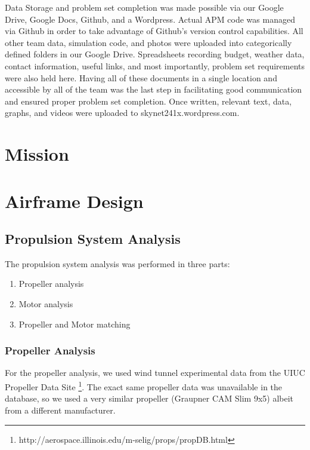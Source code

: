 \documentclass[11pt]{article}
\begin{document}
		Data Storage and problem set completion was made possible via our Google Drive, Google Docs, Github, and a Wordpress. Actual APM code was managed via Github in order to take advantage of Github's version control capabilities. All other team data, simulation code, and photos were uploaded into categorically defined folders in our Google Drive. Spreadsheets recording budget, weather data, contact information, useful links, and most importantly, problem set requirements were also held here. Having all of these documents in a single location and accessible by all of the team was the last step in facilitating good communication and ensured proper problem set completion. Once written, relevant text, data, graphs, and videos were uploaded to skynet241x.wordpress.com.

		\section{Mission}
			
			\label{Mission}

			\section{Airframe Design}
				\label{Vehicle}

				\subsection{Propulsion System Analysis}

				The propulsion system analysis was performed in three parts:
				\begin{enumerate}
					\item Propeller analysis
					\item Motor analysis
					\item Propeller and Motor matching
				\end{enumerate}

				\subsubsection{Propeller Analysis}

				For the propeller analysis, we used wind tunnel experimental data from the UIUC Propeller Data Site \footnote{http://aerospace.illinois.edu/m-selig/props/propDB.html}. The exact same propeller data was unavailable in the database, so we used a very similar propeller (Graupner CAM Slim 9x5) albeit from a different manufacturer.
\end{document}
